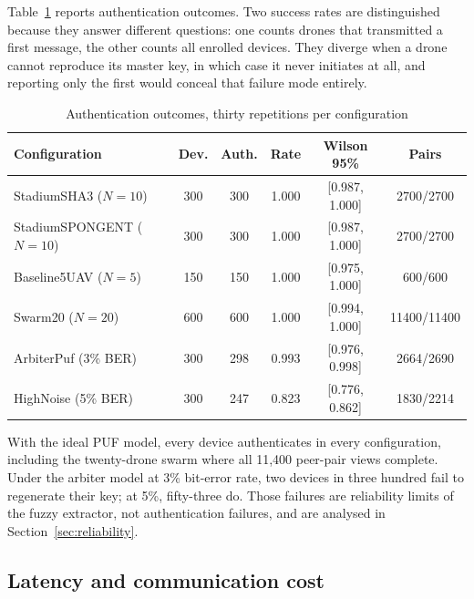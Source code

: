 \documentclass[journal]{IEEEtran}
\begin{document}
Table~\ref{tab:functional} reports authentication outcomes. Two success rates
are distinguished because they answer different questions: one counts drones
that transmitted a first message, the other counts all enrolled devices. They
diverge when a drone cannot reproduce its master key, in which case it never
initiates at all, and reporting only the first would conceal that failure mode
entirely.

\begin{table}[H]
\centering
\caption{Authentication outcomes, thirty repetitions per configuration}
\label{tab:functional}
\scriptsize
\setlength{\tabcolsep}{2.6pt}
\begin{tabular}{@{}lccccc@{}}
\toprule
\textbf{Configuration} & \textbf{Dev.} & \textbf{Auth.} & \textbf{Rate} &
\textbf{Wilson 95\%} & \textbf{Pairs} \\
\midrule
StadiumSHA3 ($N{=}10$)      & 300 & 300 & 1.000 & [0.987, 1.000] & 2700/2700 \\
StadiumSPONGENT ($N{=}10$)  & 300 & 300 & 1.000 & [0.987, 1.000] & 2700/2700 \\
Baseline5UAV ($N{=}5$)      & 150 & 150 & 1.000 & [0.975, 1.000] & 600/600 \\
Swarm20 ($N{=}20$)          & 600 & 600 & 1.000 & [0.994, 1.000] & 11400/11400 \\
ArbiterPuf (3\% BER)        & 300 & 298 & 0.993 & [0.976, 0.998] & 2664/2690 \\
HighNoise (5\% BER)         & 300 & 247 & 0.823 & [0.776, 0.862] & 1830/2214 \\
\bottomrule
\end{tabular}
\end{table}

With the ideal PUF model, every device authenticates in every configuration,
including the twenty-drone swarm where all 11{,}400 peer-pair views complete.
Under the arbiter model at 3\% bit-error rate, two devices in three hundred
fail to regenerate their key; at 5\%, fifty-three do. Those failures are
reliability limits of the fuzzy extractor, not authentication failures, and are
analysed in Section~\ref{sec:reliability}.

\subsection{Latency and communication cost}
\end{document}
